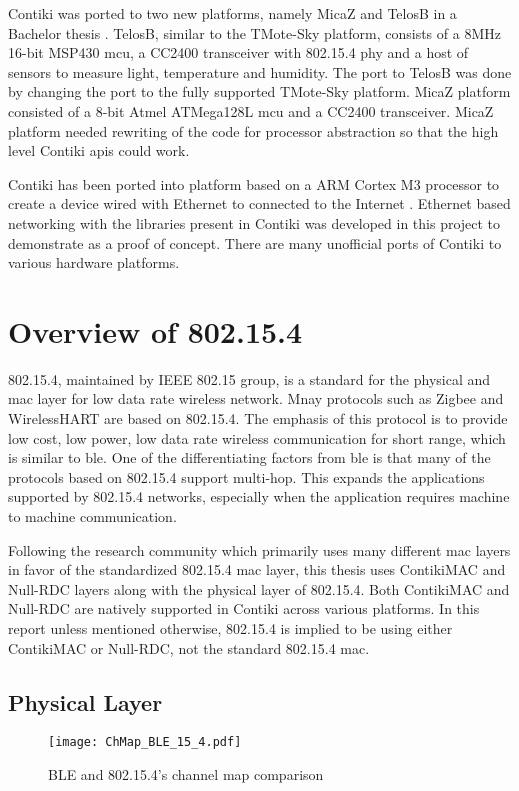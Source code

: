 Contiki was ported to two new platforms, namely MicaZ and TelosB in a Bachelor thesis \cite{stan2007porting}. TelosB, similar to the TMote-Sky platform, consists of a 8MHz 16-bit MSP430 \gls{mcu}, a CC2400 transceiver with 802.15.4 \gls{phy} and a host of sensors to measure light, temperature and humidity. The port to TelosB was done by changing the port to the fully supported TMote-Sky platform. MicaZ platform consisted of a 8-bit Atmel ATMega128L \gls{mcu} and a CC2400 transceiver. MicaZ platform needed rewriting of the code for processor abstraction so that the high level Contiki \glspl{api} could work.

Contiki has been ported into platform based on a ARM Cortex M3 processor to create a device wired with Ethernet to connected to the Internet \cite{Wilde2013a}. Ethernet based networking with the libraries present in Contiki was developed in this project to demonstrate as a proof of concept. There are many unofficial ports of Contiki to various hardware platforms.

\section{Overview of 802.15.4} \label{Overview15.4}
802.15.4, maintained by IEEE 802.15 group, is a standard for the physical and \gls{mac} layer for low data rate wireless network\cite{IEEE802154}. Mnay protocols such as Zigbee and WirelessHART are based on 802.15.4. The emphasis of this protocol is to provide low cost, low power, low data rate wireless communication for short range, which is similar to \gls{ble}. One of the differentiating factors from \gls{ble} is that many of the protocols based on 802.15.4 support multi-hop. This expands the applications supported by 802.15.4 networks, especially when the application requires machine to machine communication.

Following the research community which primarily uses many different \gls{mac} layers in favor of the standardized 802.15.4 \gls{mac} layer, this thesis uses ContikiMAC and Null-RDC layers along with the physical layer of 802.15.4. Both ContikiMAC and Null-RDC are natively supported in Contiki across various platforms. In this report unless mentioned otherwise, 802.15.4 is implied to be using either ContikiMAC or Null-RDC, not the standard 802.15.4 \gls{mac}.

\subsection{Physical Layer}
\begin{figure}[h]
\centering
\texttt{[image: ChMap\_BLE\_15\_4.pdf]}
\caption{BLE and 802.15.4's channel map comparison}
\label{fig:ChMap}
\end{figure}

